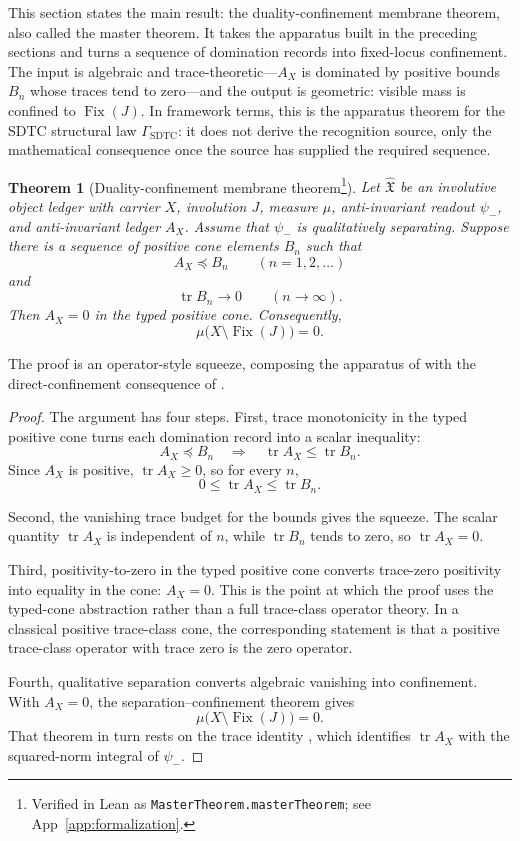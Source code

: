 \documentclass[11pt]{article}
\DeclareMathOperator{\Fix}{Fix}
\DeclareMathOperator{\trace}{tr}
\newcommand{\psim}{\psi_{-}}
\newcommand{\AX}{A_{X}}
\newcommand{\IOL}{\hat{\mathfrak{X}}}
\newcommand{\GamSDTC}{\Gamma_{\mathrm{SDTC}}}
\newtheorem{theorem}{Theorem}[section]
\theoremstyle{definition}
\begin{document}
This section states the main result: the duality-confinement
membrane theorem, also called the master theorem.  It takes the
apparatus built in the preceding sections and turns a sequence of
domination records into fixed-locus confinement.  The input is
algebraic and trace-theoretic---\(\AX\) is dominated by positive
bounds \(B_n\) whose traces tend to zero---and the output is
geometric: visible mass is confined to \(\Fix(J)\).  In framework
terms, this is the apparatus theorem for the SDTC structural law
\(\GamSDTC\): it does not derive the recognition source, only the
mathematical consequence once the source has supplied the required
sequence.

\begin{theorem}[Duality-confinement membrane theorem\protect\footnote{Verified in Lean as \nolinkurl{MasterTheorem.masterTheorem}; see App~\ref{app:formalization}.}]
\label{thm:duality_confinement:master-theorem}
Let \(\IOL\) be an involutive object ledger with carrier \(X\),
involution \(J\), measure \(\mu\), anti-invariant readout
\(\psim\), and anti-invariant ledger \(\AX\).  Assume that
\(\psim\) is qualitatively separating.  Suppose there is a sequence
of positive cone elements \(B_n\) such that
\[
  \AX\preceq B_n
  \qquad (n=1,2,\ldots)
\]
and
\[
  \trace B_n\to0
  \qquad (n\to\infty).
\]
Then \(\AX=0\) in the typed positive cone.  Consequently,
\[
  \mu\bigl(X\setminus\Fix(J)\bigr)=0.
\]
\end{theorem}

The proof is an operator-style squeeze, composing the apparatus of
with the direct-confinement consequence of
.

\begin{proof}
The argument has four steps.  First, trace monotonicity in the
typed positive cone turns each domination record into a scalar
inequality:
\[
  \AX\preceq B_n
  \quad\Longrightarrow\quad
  \trace\AX\leq\trace B_n.
\]
Since \(\AX\) is positive, \(\trace\AX\geq0\), so for every \(n\),
\[
  0\leq\trace\AX\leq\trace B_n.
\]

Second, the vanishing trace budget for the bounds gives the
squeeze.  The scalar quantity \(\trace\AX\) is independent of
\(n\), while \(\trace B_n\) tends to zero, so \(\trace\AX=0\).

Third, positivity-to-zero in the typed positive cone converts
trace-zero positivity into equality in the cone: \(\AX=0\).  This
is the point at which the proof uses the typed-cone abstraction
rather than a full trace-class operator theory.  In a classical
positive trace-class cone, the corresponding statement is that a
positive trace-class operator with trace zero is the zero operator.

Fourth, qualitative separation converts algebraic vanishing into
confinement.  With \(\AX=0\), the separation--confinement theorem
gives
\[
  \mu\bigl(X\setminus\Fix(J)\bigr)=0.
\]
That theorem in turn rests on the trace identity
, which identifies
\(\trace\AX\) with the squared-norm integral of \(\psim\).
\end{proof}
\end{document}
